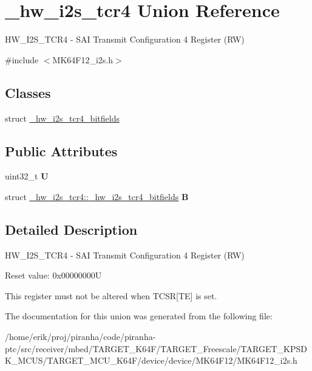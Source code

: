 \hypertarget{union__hw__i2s__tcr4}{}\section{\+\_\+hw\+\_\+i2s\+\_\+tcr4 Union Reference}
\label{union__hw__i2s__tcr4}


H\+W\+\_\+\+I2\+S\+\_\+\+T\+C\+R4 -\/ S\+AI Transmit Configuration 4 Register (RW)  




{\ttfamily \#include $<$M\+K64\+F12\+\_\+i2s.\+h$>$}

\subsection*{Classes}
\begin{DoxyCompactItemize}
\item 
struct \hyperlink{struct__hw__i2s__tcr4_1_1__hw__i2s__tcr4__bitfields}{\+\_\+hw\+\_\+i2s\+\_\+tcr4\+\_\+bitfields}
\end{DoxyCompactItemize}
\subsection*{Public Attributes}
\begin{DoxyCompactItemize}
\item 
uint32\+\_\+t {\bfseries U}\hypertarget{union__hw__i2s__tcr4_a1268cf4811b97dad8a4bc8817240bdf7}{}\label{union__hw__i2s__tcr4_a1268cf4811b97dad8a4bc8817240bdf7}

\item 
struct \hyperlink{struct__hw__i2s__tcr4_1_1__hw__i2s__tcr4__bitfields}{\+\_\+hw\+\_\+i2s\+\_\+tcr4\+::\+\_\+hw\+\_\+i2s\+\_\+tcr4\+\_\+bitfields} {\bfseries B}\hypertarget{union__hw__i2s__tcr4_ad08d12ab7a85c2e1ed8d9cca645308b0}{}\label{union__hw__i2s__tcr4_ad08d12ab7a85c2e1ed8d9cca645308b0}

\end{DoxyCompactItemize}


\subsection{Detailed Description}
H\+W\+\_\+\+I2\+S\+\_\+\+T\+C\+R4 -\/ S\+AI Transmit Configuration 4 Register (RW) 

Reset value\+: 0x00000000U

This register must not be altered when T\+C\+SR\mbox{[}TE\mbox{]} is set. 

The documentation for this union was generated from the following file\+:\begin{DoxyCompactItemize}
\item 
/home/erik/proj/piranha/code/piranha-\/ptc/src/receiver/mbed/\+T\+A\+R\+G\+E\+T\+\_\+\+K64\+F/\+T\+A\+R\+G\+E\+T\+\_\+\+Freescale/\+T\+A\+R\+G\+E\+T\+\_\+\+K\+P\+S\+D\+K\+\_\+\+M\+C\+U\+S/\+T\+A\+R\+G\+E\+T\+\_\+\+M\+C\+U\+\_\+\+K64\+F/device/device/\+M\+K64\+F12/M\+K64\+F12\+\_\+i2s.\+h\end{DoxyCompactItemize}
